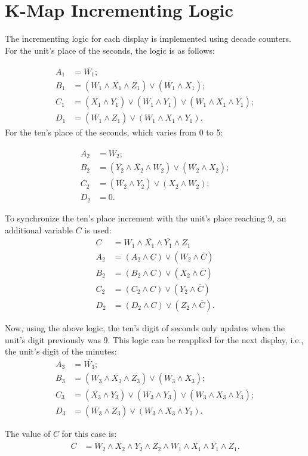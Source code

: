 \section{K-Map Incrementing Logic}
The incrementing logic for each display is implemented using decade counters. For the unit's place of the seconds, the logic is as follows:


\begin{align}
    A_1 &= \overline{W_1}; \\
    B_1 &= (W_1 \land \overline{X_1} \land \overline{Z_1}) \lor (\overline{W_1} \land X_1);\\
    C_1 &= (\overline{X_1} \land Y_1) \lor (\overline{W_1} \land Y_1) \lor (W_1 \land X_1 \land \overline{Y_1});\\
    D_1 &= (\overline{W_1} \land Z_1) \lor (W_1 \land X_1 \land Y_1).
\end{align}
For the ten's place of the seconds, which varies from 0 to 5:


\begin{align}
    A_2 &= \overline{W_2};\\
    B_2 &= (\overline{Y_2} \land \overline{X_2} \land W_2) \lor (\overline{W_2} \land X_2);\\
    C_2 &= (\overline{W_2} \land Y_2) \lor (X_2 \land W_2);\\
    D_2 &= 0.
\end{align}

To synchronize the ten's place increment with the unit's place reaching 9, an additional variable $C$ is used:
\begin{align}
    C &= W_1 \land \overline{X_1} \land \overline{Y_1} \land Z_1 \\
    A_2 &= (A_2 \land C) \lor (W_2 \land \overline{C}) \\
    B_2 &= (B_2 \land C) \lor (X_2 \land \overline{C}) \\
    C_2 &= (C_2 \land C) \lor (Y_2 \land \overline{C}) \\
    D_2 &= (D_2 \land C) \lor (Z_2 \land \overline{C}).
\end{align}

Now, using the above logic, the ten's digit of seconds only updates when the unit's digit previously was 9. This logic can be reapplied for the next display, i.e., the unit's digit of the minutes:
\begin{align}
    A_3 &= \overline{W_3}; \\
    B_3 &= (W_3 \land \overline{X_3} \land \overline{Z_3}) \lor (\overline{W_3} \land X_3);\\
    C_3 &= (\overline{X_3} \land Y_3) \lor (\overline{W_3} \land Y_3) \lor (W_3 \land X_3 \land \overline{Y_3});\\
    D_3 &= (\overline{W_3} \land Z_3) \lor (W_3 \land X_3 \land Y_3).
\end{align}

The value of $C$ for this case is:
\begin{align}
    C &= W_2 \land \overline{X_2} \land Y_2 \land \overline{Z_2} \land W_1 \land \overline{X_1} \land \overline{Y_1} \land Z_1.
\end{align}
